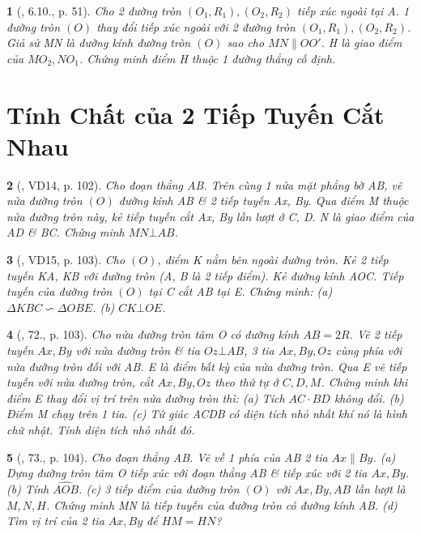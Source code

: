 \documentclass{article}
\newtheorem{baitoan}{}
\begin{document}
\begin{baitoan}[\cite{TLCT_THCS_Toan_9_hinh_hoc}, 6.10., p. 51]
	Cho 2 đường tròn $(O_1,R_1),(O_2,R_2)$ tiếp xúc ngoài tại A. 1 đường tròn $(O)$ thay đổi tiếp xúc ngoài với 2 đường tròn $(O_1,R_1),(O_2,R_2)$. Giả sử MN là đường kính đường tròn $(O)$ sao cho $MN\parallel OO'$. H là giao điểm của $MO_2,NO_1$. Chứng minh điểm H thuộc 1 đường thẳng cố định.
\end{baitoan}


\section{Tính Chất của 2 Tiếp Tuyến Cắt Nhau}

\begin{baitoan}[\cite{Binh_Toan_9_tap_1}, VD14, p. 102]
	Cho đoạn thẳng AB. Trên cùng 1 nửa mặt phẳng bờ AB, vẽ nửa đường tròn $(O)$ đường kính AB \& 2 tiếp tuyến Ax, By. Qua điểm M thuộc nửa đường tròn này, kẻ tiếp tuyến cắt Ax, By lần lượt ở C, D. N là giao điểm của AD \& BC. Chứng minh $MN\bot AB$.
\end{baitoan}

\begin{baitoan}[\cite{Binh_Toan_9_tap_1}, VD15, p. 103]
	Cho $(O)$, điểm K nằm bên ngoài đường tròn. Kẻ 2 tiếp tuyến KA, KB với đường tròn (A, B là 2 tiếp điểm). Kẻ đường kính AOC. Tiếp tuyến của đường tròn $(O)$ tại C cắt AB tại E. Chứng minh: (a) $\Delta KBC\backsim\Delta OBE$. (b) $CK\bot OE$.
\end{baitoan}

\begin{baitoan}[\cite{Binh_Toan_9_tap_1}, 72., p. 103]
	Cho nửa đường tròn tâm O có đường kính $AB = 2R$. Vẽ 2 tiếp tuyến $Ax,By$ với nửa đường tròn \& tia $Oz\bot AB$, 3 tia $Ax,By,Oz$ cùng phía với nửa đường tròn đối với AB. E là điểm bất kỳ của nửa đường tròn. Qua E vẽ tiếp tuyến với nửa đường tròn, cắt $Ax,By,Oz$ theo thứ tự ở $C,D,M$. Chứng minh khi điểm E thay đổi vị trí trên nửa đường tròn thì: (a) Tích $AC\cdot BD$ không đổi. (b) Điểm M chạy trên 1 tia. (c) Tứ giác ACDB có diện tích nhỏ nhất khí nó là hình chữ nhật. Tính diện tích nhỏ nhất đó.
\end{baitoan}

\begin{baitoan}[\cite{Binh_Toan_9_tap_1}, 73., p. 104]
	Cho đoạn thẳng AB. Vẽ về 1 phía của AB 2 tia $Ax\parallel By$. (a) Dựng đường tròn tâm O tiếp xúc với đoạn thẳng AB \& tiếp xúc với 2 tia $Ax,By$. (b) Tính $\widehat{AOB}$. (c) 3 tiếp điểm của đường tròn $(O)$ với $Ax,By,AB$ lần lượt là $M,N,H$. Chứng minh MN là tiếp tuyến của đường tròn có đường kính AB. (d) Tìm vị trí của 2 tia $Ax,By$ để $HM = HN$?
\end{baitoan}
\end{document}
